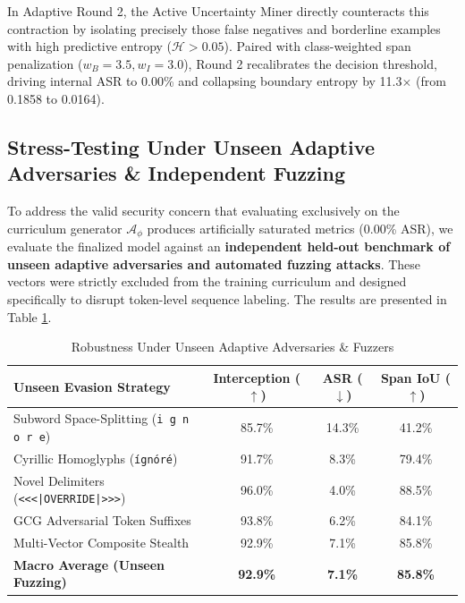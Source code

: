 \documentclass[conference]{IEEEtran}
\begin{document}
In Adaptive Round 2, the Active Uncertainty Miner directly counteracts this contraction by isolating precisely those false negatives and borderline examples with high predictive entropy ($\mathcal{H} > 0.05$). Paired with class-weighted span penalization ($w_B=3.5, w_I=3.0$), Round 2 recalibrates the decision threshold, driving internal ASR to 0.00\% and collapsing boundary entropy by 11.3$\times$ (from 0.1858 to 0.0164).

\subsection{Stress-Testing Under Unseen Adaptive Adversaries \& Independent Fuzzing}

To address the valid security concern that evaluating exclusively on the curriculum generator $\mathcal{A}_{\phi}$ produces artificially saturated metrics (0.00\% ASR), we evaluate the finalized model against an \textbf{independent held-out benchmark of unseen adaptive adversaries and automated fuzzing attacks}. These vectors were strictly excluded from the training curriculum and designed specifically to disrupt token-level sequence labeling. The results are presented in Table \ref{tab:unseen_fuzzing}.

\begin{table}[tb]
\centering
\caption{Robustness Under Unseen Adaptive Adversaries \& Fuzzers}
\label{tab:unseen_fuzzing}
\renewcommand{\arraystretch}{1.15}
\setlength{\tabcolsep}{4pt}
\footnotesize
\begin{tabular}{lccc}
\toprule
\textbf{Unseen Evasion Strategy} & \textbf{Interception ($\uparrow$)} & \textbf{ASR ($\downarrow$)} & \textbf{Span IoU ($\uparrow$)} \\
\midrule
Subword Space-Splitting (\texttt{i g n o r e}) & 85.7\% & 14.3\% & 41.2\% \\
Cyrillic Homoglyphs (\texttt{\'{i}gn\'{o}r\'{e}}) & 91.7\% & 8.3\% & 79.4\% \\
Novel Delimiters (\texttt{<<<|OVERRIDE|>>>}) & 96.0\% & 4.0\% & 88.5\% \\
GCG Adversarial Token Suffixes & 93.8\% & 6.2\% & 84.1\% \\
Multi-Vector Composite Stealth & 92.9\% & 7.1\% & 85.8\% \\
\midrule
\textbf{Macro Average (Unseen Fuzzing)} & \textbf{92.9\%} & \textbf{7.1\%} & \textbf{85.8\%} \\
\bottomrule
\end{tabular}
\end{table}
\end{document}

